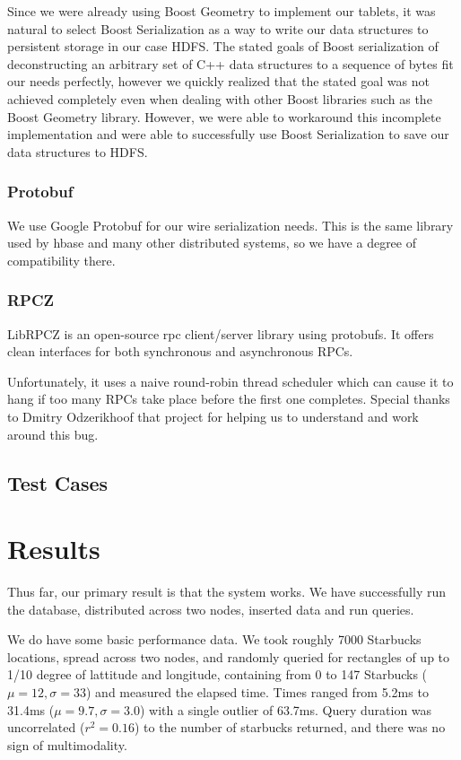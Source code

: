 \documentclass[11pt]{article}
\begin{document}
Since we were already using Boost Geometry to implement our tablets, it was natural to select Boost Serialization as a way to write our data structures to persistent storage in our case HDFS. The stated goals of Boost serialization of deconstructing an arbitrary set of C++ data structures to a sequence of bytes fit our needs perfectly, however we quickly realized that the stated goal was not achieved completely even when dealing with other Boost libraries such as the Boost Geometry library. However, we were able to workaround this incomplete implementation and were able to successfully use Boost Serialization to save our data structures to HDFS.

\subsubsection{Protobuf}

We use Google Protobuf for our wire serialization needs. This is the same library used by hbase and many other distributed systems, so we have a degree of compatibility there.

\subsubsection{RPCZ}

LibRPCZ is an open-source rpc client/server library using protobufs. It offers clean interfaces for both synchronous and asynchronous RPCs.

Unfortunately, it uses a naive round-robin thread scheduler which can cause it to hang if too many RPCs take place before the first one completes. Special thanks to Dmitry Odzerikhoof that project for helping us to understand and work around this bug.

\subsection{Test Cases}

\section{Results}

Thus far, our primary result is that the system works.  We have successfully run the database, distributed across two nodes, inserted data and run queries.

We do have some basic performance data.  We took roughly 7000 Starbucks locations, spread across two nodes, and randomly queried for rectangles of up to 1/10 degree of lattitude and longitude, containing from 0 to 147 Starbucks ($\mu=12, \sigma=33$) and measured the elapsed time.  Times ranged from 5.2ms to 31.4ms ($\mu=9.7, \sigma=3.0$) with a single outlier of 63.7ms.  Query duration was uncorrelated ($r^2=0.16$) to the number of starbucks returned, and there was no sign of multimodality.
\end{document}
